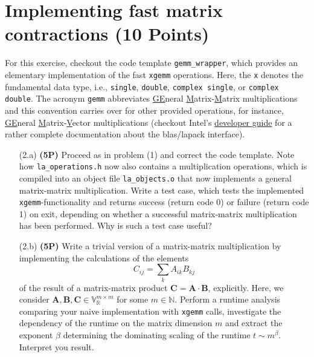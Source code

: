 \documentclass[a4paper, 12pt]{article}
\begin{document}
\section{Implementing fast matrix contractions \textbf{(10 Points)}}
%
For this exercise, checkout the code template \texttt{gemm\_wrapper}, which provides an elementary implementation of the fast \texttt{xgemm} operations.
%
Here, the \texttt{x} denotes the fundamental data type, i.e., \texttt{single}, \texttt{double}, \texttt{complex single}, or \texttt{complex double}.
%
The acronym \texttt{gemm} abbreviates \underline{GE}neral \underline{M}atrix-\underline{M}atrix multiplications and this convention carries over for other provided operations, for instance, \underline{GE}neral \underline{M}atrix-\underline{V}ector multiplications (checkout Intel's \href{https://www.intel.com/content/www/us/en/docs/onemkl/developer-guide-linux/2023-1/overview.html}{developer guide} for a rather complete documentation about the blas/lapack interface).
%
\begin{itemize}
	\item[(2.a)] \textbf{(5P)}
	Proceed as in problem (1) and correct the code template.
	Note how \texttt{la\_operations.h} now also contains a multiplication operations, which is compiled into an object file \texttt{la\_objects.o} that now implements a general matrix-matrix multiplication.
	Write a test case, which tests the implemented \texttt{xgemm}-functionality and returns success (return code 0) or failure (return code 1) on exit, depending on whether a successful matrix-matrix multiplication has been performed.
	Why is such a test case useful?
	\item[(2.b)] \textbf{(5P)}
	Write a trivial version of a matrix-matrix multiplication by implementing the calculations of the elements
	\begin{equation}
		C_{ij} = \sum_k A_{ik} B_{kj}
	\end{equation}
	of the result of a matrix-matrix product $\mathbf C = \mathbf A \cdot \mathbf B$, explicitly.
	Here, we consider $\mathbf A, \mathbf B, \mathbf C \in \mathbb V^{m\times m}_\mathbb{R}$ for some $m\in \mathbb N$.
	Perform a runtime analysis comparing your naive implementation with \texttt{xgemm} calls, investigate the dependency of the runtime on the matrix dimension $m$ and extract the exponent $\beta$ determining the dominating scaling of the runtime $t \sim m^\beta$.
	Interpret you result.
\end{itemize}
%
\end{document}
